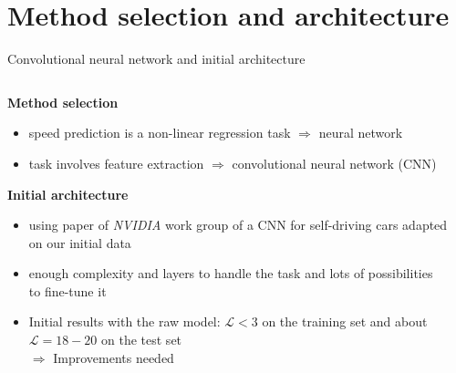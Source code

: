 \section{Method selection and architecture}

\begin{frame}{Convolutional neural network and initial architecture}
	\begin{columns}[c]
		\begin{column}{0.55\textwidth}
			\textbf{Method selection}
			\begin{itemize}
				\item<+-> speed prediction is a non-linear regression task $\Rightarrow$ neural network
				\item<+-> task involves feature extraction $\Rightarrow$ convolutional neural network (CNN)
			\end{itemize}
			\textbf{Initial architecture}
			\begin{itemize}
				\item<+-> using paper of \textit{NVIDIA} work group \cite{NVIDIA2016} of a CNN for self-driving cars adapted on our initial data
				\item<+-> enough complexity and layers to handle the task and lots of possibilities to fine-tune it
				\item<+-> Initial results with the raw model: $\mathcal{L} < 3$ on the training set and about $\mathcal{L} = 18-20$ on the test set\\
				$\Rightarrow$ Improvements needed
			\end{itemize}
		\end{column}
		\begin{column}{0.4\textwidth}

\end{column}
\end{columns}
\end{frame}
